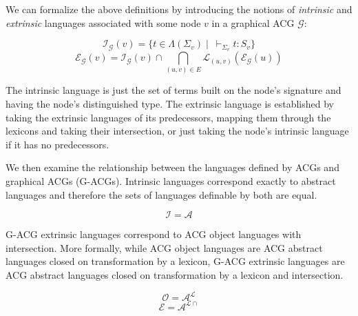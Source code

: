 \documentclass{llncs}
\begin{document}
We can formalize the above definitions by introducing the notions of
\emph{intrinsic} and \emph{extrinsic} languages associated with some node $v$
in a graphical ACG $\mathcal{G}$:

$$
\mathcal{I}_{\mathcal{G}}(v) = \{t \in \Lambda(\Sigma_v)
\mid\ \vdash_{\Sigma_v} t : S_v\}
$$
$$
\mathcal{E}_{\mathcal{G}}(v) = \mathcal{I}_{\mathcal{G}}(v) \cap
\bigcap_{(u,v) \in E} \mathcal{L}_{(u,v)}(\mathcal{E}_{\mathcal{G}}(u))
$$

The intrinsic language is just the set of terms built on the node's signature
and having the node's distinguished type. The extrinsic language is
established by taking the extrinsic languages of its predecessors, mapping
them through the lexicons and taking their intersection, or just taking the
node's intrinsic language if it has no predecessors.

We then examine the relationship between the languages defined by ACGs
and graphical ACGs (G-ACGs). Intrinsic languages correspond exactly to
abstract languages and therefore the sets of languages definable by both
are equal.

$$
\mathcal{I} = \mathcal{A}
$$

G-ACG extrinsic languages correspond to ACG object languages with
intersection. More formally, while ACG object languages are ACG abstract
languages closed on transformation by a lexicon, G-ACG extrinsic languages are
ACG abstract languages closed on transformation by a lexicon and
intersection.

$$
\mathcal{O} = \mathcal{A}^{\mathcal{L}}
$$
$$
\mathcal{E} = \mathcal{A}^{\mathcal{L}{\cap}}
$$
\end{document}

